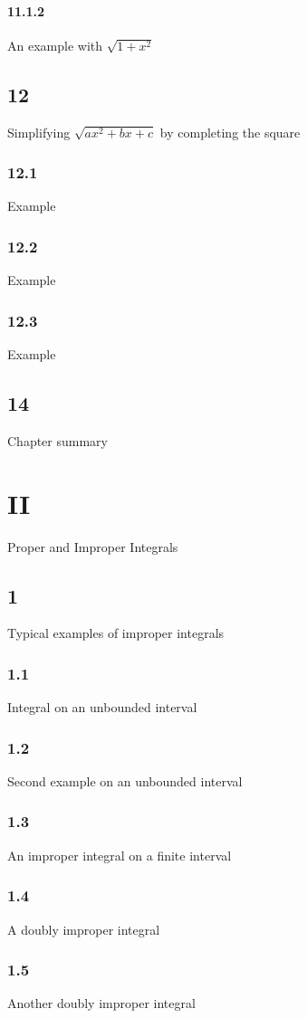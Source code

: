 \subsubsection{11.1.2}{An example with $\sqrt {1+x^2}$}
\section{12}{Simplifying $\sqrt {ax^2+bx+c}$ by completing the square}
\subsection{12.1}{Example}
\subsection{12.2}{Example}
\subsection{12.3}{Example}

\section{14}{Chapter summary}

\chapter{II}{Proper and Improper Integrals}
\section{1}{Typical examples of improper integrals}
\subsection{1.1}{Integral on an unbounded interval}
\subsection{1.2}{Second example on an unbounded interval}
\subsection{1.3}{An improper integral on a finite interval}
\subsection{1.4}{A doubly improper integral}
\subsection{1.5}{Another doubly improper integral}
